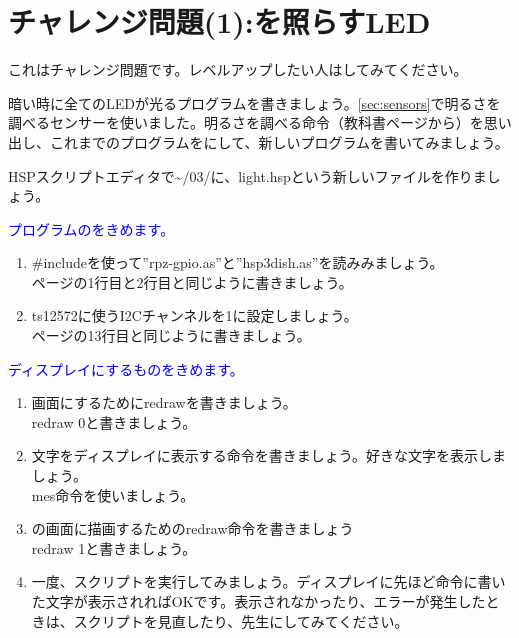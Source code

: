 \section{チャレンジ問題(1):を照らすLED}
\label{Yamiyo}
これはチャレンジ問題です。レベルアップしたい人はしてみてください。

暗い時に全てのLEDが光るプログラムを書きましょう。\ref{sec:sensors}で明るさを調べるセンサーを使いました。明るさを調べる命令（教科書\pageref{sec:sensors}ページから）を思い出し、これまでのプログラムをにして、新しいプログラムを書いてみましょう。\\
\begin{enumerate}
\renewcommand{\theenumii}{\arabic{enumii}}
\renewcommand{\labelenumii}{\theenumi.\theenumii}
\item HSPスクリプトエディタで\textasciitilde /03/に、light.hspという新しいファイルを作りましょう。
\textcolor{blue}{\item プログラムのをきめます。}
\begin{enumerate}
\item \#includeを使って”rpz-gpio.as”と”hsp3dish.as”を読みみましょう。\\
\pageref{sensors.hsp}ページの1行目と2行目と同じように書きましょう。
\item ts12572に使うI2Cチャンネルを1に設定しましょう。\\
\pageref{sensors.hsp}ページの13行目と同じように書きましょう。
\end{enumerate}
\textcolor{blue}{\item ディスプレイにするものをきめます。}
\begin{enumerate}
\item {}画面にするためにredrawを書きましょう。\\
redraw 0と書きましょう。
\item 文字をディスプレイに表示する命令を書きましょう。好きな文字を表示しましょう。\\
mes命令を使いましょう。
\item {}の画面に描画するためのredraw命令を書きましょう\\
redraw 1と書きましょう。
\item 一度、スクリプトを実行してみましょう。ディスプレイに先ほど命令に書いた文字が表示されればOKです。表示されなかったり、エラーが発生したときは、スクリプトを見直したり、先生にしてみてください。

\end{enumerate}
\end{enumerate}
